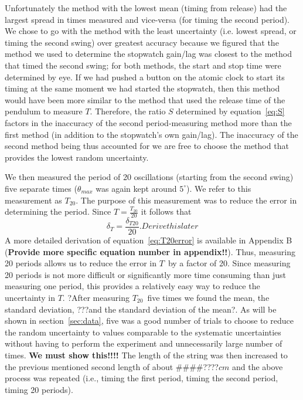 \documentclass[iop,numberedappendix,appendixfloats]{emulateapj}
\def\T{$T$}
\def\Ttwen{$T_{20}$}
\def\fillin{\#\#\#\#????}
\def\deg{^{\circ}}
\begin{document}
Unfortunately the method with the lowest 
mean (timing from release) had the largest spread in times measured and 
vice-versa (for timing the second period). We chose to go 
with the method with the least uncertainty (i.e. lowest spread, or timing the 
second swing) over greatest accuracy because we figured that the method we 
used to determine the stopwatch gain/lag was closest to the method that timed 
the second swing; for both methods, the start and stop time were determined by 
eye.  If we had pushed a button on the atomic clock to start its timing at the 
same moment we had started the stopwatch, then this method would have been 
more similar to the method that used the release time of the pendulum to 
measure \T.  Therefore, the ratio $S$ determined by equation~\ref{eq:S} 
factors in the inaccuracy of the second period-measuring method more 
than the first method (in addition to the stopwatch's own gain/lag). The 
inaccuracy of the second method being thus accounted for we are free to choose 
the method that provides the lowest random uncertainty. 

We then measured the period of 20 oscillations (starting from the second 
swing) five separate times ($\theta_{max}$ was again kept around $5\deg$). 
We refer to this measurement as $T_{20}$. The purpose of this 
measurement was to reduce the error in determining the period.  Since 
$T=\frac{T_{20}}{20}$ it follows that
\begin{equation}
\label{eq:T20error}
\delta_T = \frac{\delta_{T20}}{20}.  Derive this later
\end{equation}
A more detailed derivation of equation~\ref{eq:T20error} is available in 
Appendix B ({\bf Provide more specific equation number in appendix!!}).
Thus, measuring 20 periods allows us to reduce the error in \T\ by a factor of 
20.  Since measuring 20 periods is not more difficult or significantly more 
time consuming than just measuring one period, this provides a relatively easy 
way to reduce the uncertainty in \T.  ?After measuring \Ttwen\ five times we 
found the mean, the standard deviation, ???and the standard deviation of the 
mean?.  As will be shown in section~\ref{sec:data}, five was a good number of trials to 
choose to reduce the random uncertainty to values comparable to the systematic 
uncertainties without having to perform the experiment and unnecessarily large 
number of times. {\bf We must show this!!!!}  The length of the string was 
then increased to the previous mentioned second length of 
about \fillin $cm$ and the above process was repeated (i.e., 
timing the first period, timing the second period, timing 20 periods).
\end{document}
